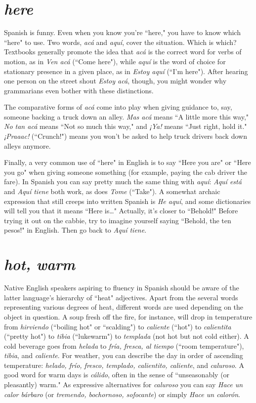 \section{\emph{here}}

Spanish is funny. Even when you know you're ``here," you
have to know which ``here" to use. Two words, \emph{acá} and \emph{aquí}, cover
the situation. Which is which? Textbooks generally promote the idea
that \emph{acá} is the correct word for verbs of motion, as in \emph{Ven acá} (``Come
here"), while \emph{aquí} is the word of choice for stationary presence in a
given place, as in \emph{Estoy aquí} (``I'm here"). After hearing one person on
the street shout \emph{Estoy acá}, though, you might wonder why grammarians even bother with these distinctions.

The comparative forms of \emph{acá} come into play when giving
guidance to, say, someone backing a truck down an alley. \emph{Mas acá}
means ``A little more this way," \emph{No tan acá} means ``Not so much this
way," and \emph{¡Ya!} means ``Just right, hold it." \emph{¡Praaac!} (``Crunch!") means
you won't be asked to help truck drivers back down alleys anymore.

Finally, a very common use of ``here" in English is to say
``Here you are" or ``Here you go" when giving someone something (for
example, paying the cab driver the fare). In Spanish you can say pretty
much the same thing with \emph{aquí}: \emph{Aquí está} and \emph{Aquí tiene} both work,
as does \emph{Tome} (``Take"). A somewhat archaic expression that still creeps
into written Spanish is \emph{He aquí}, and some dictionaries will tell you
that it means ``Here is\ldots{}" Actually, it's closer to ``Behold!" Before
trying it out on the cabbie, try to imagine yourself saying ``Behold, the
ten pesos!" in English. Then go back to \emph{Aquí tiene}.

\section{\emph{hot, warm}}

Native English speakers aspiring to fluency in Spanish should
be aware of the latter language's hierarchy of ``heat" adjectives. Apart
from the several words representing various degrees of heat, different
words are used depending on the object in question. A soup fresh off
the fire, for instance, will drop in temperature from \emph{hirviendo} (``boiling
hot" or ``scalding") to \emph{caliente} (``hot") to \emph{calientita} (``pretty hot") to
\emph{tibia} (``lukewarm") to \emph{templada} (not hot but not cold either). A cold
beverage goes from \emph{helada} to \emph{fría, fresca, al tiempo} (``room temperature"), \emph{tibia}, and \emph{caliente}. For weather, you can describe the day in order of ascending temperature: \emph{helado, frío, fresco, templado, calientito, caliente}, and \emph{caluroso}. A good word for warm days is \emph{cálido}, often
in the sense of ``unseasonably (or pleasantly) warm." As expressive alternatives for \emph{caluroso} you can say \emph{Hace un calor bárbaro} (or \emph{tremendo, bochornoso, sofocante}) or simply \emph{Hace un calorón}.

